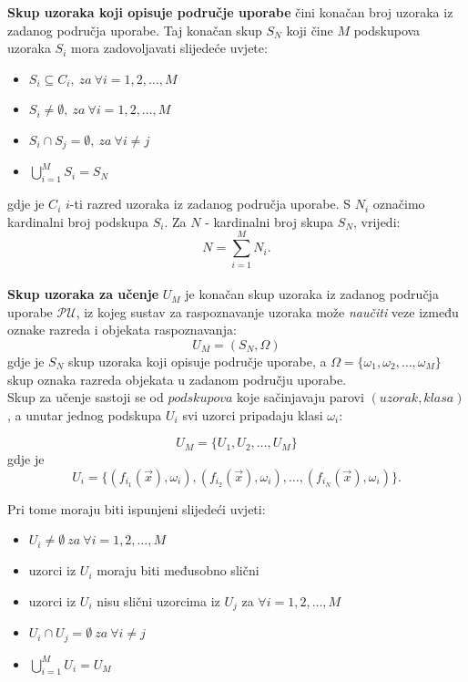 \documentclass{book}
\begin{document}
  \textbf{ Skup uzoraka koji opisuje područje uporabe } čini
 konačan broj uzoraka iz zadanog područja  uporabe. Taj konačan  skup $S_N$ koji
 čine $M$ podskupova uzoraka $S_i$ mora zadovoljavati slijedeće uvjete:
\begin{itemize}
  \item $S_i \subseteq C_i, \ za \ \forall i=1,2,\ldots, M $
  \item $S_i \neq \emptyset, \ za \ \forall i=1,2,\ldots, M$
  \item $S_i \cap S_j = \emptyset, \ za \ \forall i \neq j$
  \item $\bigcup\limits^{M}_{i=1}S_i = S_N $
\end{itemize}
gdje je $C_i$ $i$-ti razred uzoraka iz zadanog područja uporabe. S $N_i$
označimo kardinalni broj podskupa $S_i$. Za $N$ - kardinalni broj skupa $S_N$,
 vrijedi:
$$ N = \sum\limits^{M}_{i=1}N_i .$$ \\

 \textbf{Skup uzoraka za učenje }  $U_M$   je konačan skup uzoraka iz zadanog
 područja uporabe $\mathcal{PU}$, iz kojeg sustav  za raspoznavanje  uzoraka
 može \textit{naučiti} veze  između  oznake  razreda i objekata  raspoznavanja: $$
 U_M = ( S_N, \Omega) $$  gdje  je $S_N$ skup uzoraka koji  opisuje područje 
 uporabe,  a $\Omega = \{ \omega_1, \omega_2, \ldots, \omega_M \}$ skup   oznaka
 razreda objekata u zadanom području uporabe. \\

Skup za učenje sastoji se od $podskupova$ koje sačinjavaju parovi $(uzorak,
klasa)$, a unutar jednog podskupa $U_i$ svi uzorci pripadaju klasi $\omega_i$:

$$U_M = \{ U_1, U_2, \ldots, U_M \}$$ 
gdje je 
$$ U_i = \{ ( f_{i_1}( \vec{x} ), \omega_i ), ( f_{i_2}( \vec{x} ), \omega_i) ,
\ldots, ( f_{i_N}( \vec{x} ), \omega_i ) \}. $$ 

\noindent Pri tome moraju biti ispunjeni slijedeći uvjeti: 
\begin{itemize}
  \item $U_i \neq \emptyset \ za \ \forall i=1,2,\ldots, M $
  \item uzorci iz $U_i$ moraju biti međusobno slični
  \item uzorci iz $U_i$ nisu slični uzorcima iz $U_j$ za $ \forall
  i=1,2,\ldots, M$
  \item $U_i \cap U_j = \emptyset \ za \ \forall i \neq j$
  \item $\bigcup\limits^{M}_{i=1} U_i = U_M$ \\
\end{itemize}
\end{document}
